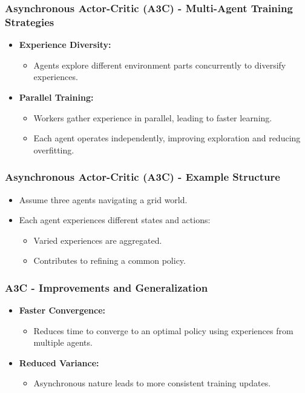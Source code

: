 \documentclass{beamer}
\begin{document}
\begin{frame}[fragile]
    \frametitle{Asynchronous Actor-Critic (A3C) - Multi-Agent Training Strategies}
    \begin{itemize}
        \item \textbf{Experience Diversity:} 
        \begin{itemize}
            \item Agents explore different environment parts concurrently to diversify experiences.
        \end{itemize}
        \item \textbf{Parallel Training:}
        \begin{itemize}
            \item Workers gather experience in parallel, leading to faster learning.
            \item Each agent operates independently, improving exploration and reducing overfitting.
        \end{itemize}
    \end{itemize}
\end{frame}

\begin{frame}[fragile]
    \frametitle{Asynchronous Actor-Critic (A3C) - Example Structure}
    \begin{itemize}
        \item Assume three agents navigating a grid world.
        \item Each agent experiences different states and actions:
        \begin{itemize}
            \item Varied experiences are aggregated.
            \item Contributes to refining a common policy.
        \end{itemize}
    \end{itemize}
\end{frame}

\begin{frame}[fragile]
    \frametitle{A3C - Improvements and Generalization}
    \begin{itemize}
        \item \textbf{Faster Convergence:} 
        \begin{itemize}
            \item Reduces time to converge to an optimal policy using experiences from multiple agents.
        \end{itemize}
        \item \textbf{Reduced Variance:}
        \begin{itemize}
            \item Asynchronous nature leads to more consistent training updates.
        \end{itemize}
    \end{itemize}
\end{frame}
\end{document}
